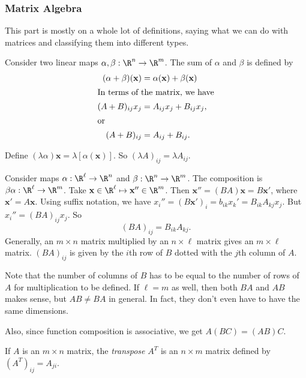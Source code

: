 \documentclass[a4paper]{article}
\begin{document}
\subsubsection{Matrix Algebra}
This part is mostly on a whole lot of definitions, saying what we can do with matrices and classifying them into different types.

\begin{defi} Consider two linear maps $\alpha, \beta: \R^n\to \R^m$. The sum of $\alpha$ and $\beta$ is defined by
  \begin{align*}
    (\alpha + \beta)(\mathbf{x}) &= \alpha(\mathbf{x}) + \beta(\mathbf{x})\\
    \intertext{In terms of the matrix, we have}
    (A + B)_{ij}x_j &= A_{ij}x_j + B_{ij}x_j,\\
    \intertext{or}
    (A + B)_{ij} &= A_{ij}+B_{ij}.
  \end{align*}
\end{defi}

\begin{defi}
  Define $(\lambda\alpha)\mathbf{x} = \lambda[\alpha(\mathbf{x})]$. So $(\lambda A)_{ij} = \lambda A_{ij}$.
\end{defi}

\begin{defi}
  Consider maps $\alpha: \R^\ell \to \R^n$  and $\beta: \R^n\to \R^m$. The composition is $\beta\alpha:\R^\ell\to\R^m$. Take $\mathbf{x}\in \R^\ell\mapsto \mathbf{x}''\in \R^m$. Then $\mathbf{x}'' = (BA)\mathbf{x} = B\mathbf{x'}$, where $\mathbf{x}' = A\mathbf{x}$. Using suffix notation, we have $x_i'' = (B\mathbf{x}')_i = b_{ik}x_k' = B_{ik}A_{kj}x_j$. But $x_i'' = (BA)_{ij}x_j$. So
  \[
    (BA)_{ij} = B_{ik}A_{kj}.
  \]
  Generally, an $m\times n$ matrix multiplied by an $n\times \ell$ matrix gives an $m\times\ell$ matrix. $(BA)_{ij}$ is given by the $i$th row of $B$ dotted with the $j$th column of $A$.
\end{defi}
Note that the number of columns of $B$ has to be equal to the number of rows of $A$ for multiplication to be defined. If $\ell = m$ as well, then both $BA$ and $AB$ makes sense, but $AB\not= BA$ in general. In fact, they don't even have to have the same dimensions.

Also, since function composition is associative, we get $A(BC) = (AB)C$.

\begin{defi}
  If $A$ is an $m\times n$ matrix, the \emph{transpose} $A^T$ is an $n\times m$ matrix defined by $(A^T)_{ij} = A_{ji}$.
\end{defi}
\end{document}
